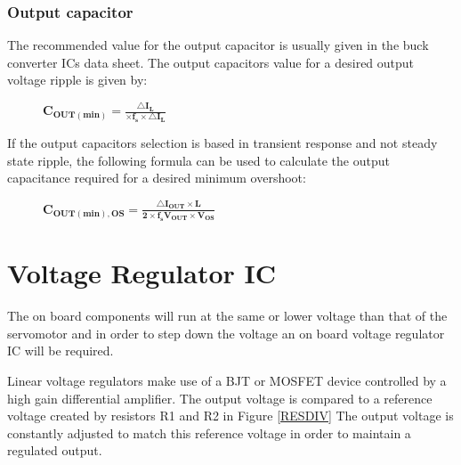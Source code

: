\newpage
\subsubsection{Output capacitor}
\vspace{-5mm}
The recommended value for the output capacitor is usually given in the buck converter ICs data sheet. The output capacitors value for a desired output voltage ripple is given by:
\vspace{-5mm}
\begin{figure}[H]
    \centering
    \large
    $\mathbf{C_{OUT(min)} = \frac{\triangle I_L}{\times f_s \times \triangle I_L}}$
\end{figure}
\vspace{-7mm}
If the output capacitors selection is based in transient response and not steady state ripple, the following formula can be used to calculate the output capacitance required for a desired minimum overshoot: 
\begin{figure}[H]
    \centering
    \large
    $\mathbf{C_{OUT(min),OS} = \frac{\triangle I_{OUT} \times L}{2 \times f_s V_{OUT} \times V_{OS}}}$
\end{figure}

\vspace{-9mm}
\section{Voltage Regulator IC}
\vspace{-5mm}
The on board components will run at the same or lower voltage than that of the servomotor and in order to step down the voltage an on board voltage regulator IC will be required.

Linear voltage regulators make use of a BJT or MOSFET device controlled by a high gain differential amplifier. The output voltage is compared to a reference voltage created by resistors R1 and R2 in Figure \ref{RESDIV} The output voltage is constantly adjusted to match this reference voltage in order to maintain a regulated output.  

